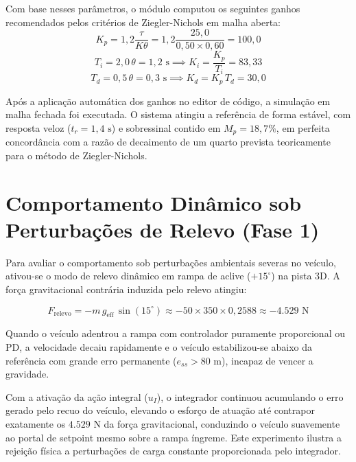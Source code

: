 Com base nesses parâmetros, o módulo computou os seguintes ganhos recomendados pelos critérios de Ziegler-Nichols em malha aberta:
\begin{equation}
    K_p = 1{,}2 \frac{\tau}{K \theta} = 1{,}2 \frac{25{,}0}{0{,}50 \times 0{,}60} = 100{,}0
\end{equation}
\begin{equation}
    T_i = 2{,}0 \, \theta = 1{,}2\text{ s} \implies K_i = \frac{K_p}{T_i} = 83{,}33
\end{equation}
\begin{equation}
    T_d = 0{,}5 \, \theta = 0{,}3\text{ s} \implies K_d = K_p \, T_d = 30{,}0
\end{equation}

Após a aplicação automática dos ganhos no editor de código, a simulação em malha fechada foi executada. O sistema atingiu a referência de forma estável, com resposta veloz ($t_r = 1{,}4\text{ s}$) e sobressinal contido em $M_p = 18{,}7\%$, em perfeita concordância com a razão de decaimento de um quarto prevista teoricamente para o método de Ziegler-Nichols.

\section{Comportamento Dinâmico sob Perturbações de Relevo (Fase 1)}
\label{sec:perturbacoes_relevo}

Para avaliar o comportamento sob perturbações ambientais severas no veículo, ativou-se o modo de relevo dinâmico em rampa de aclive ($+15^\circ$) na pista 3D. A força gravitacional contrária induzida pelo relevo atingiu:

\begin{equation}
    F_{\text{relevo}} = - m \, g_{\text{eff}} \, \sin(15^\circ) \approx -50 \times 350 \times 0{,}2588 \approx -4.529\text{ N}
\end{equation}

Quando o veículo adentrou a rampa com controlador puramente proporcional ou PD, a velocidade decaiu rapidamente e o veículo estabilizou-se abaixo da referência com grande erro permanente ($e_{ss} > 80\text{ m}$), incapaz de vencer a gravidade. 

Com a ativação da ação integral ($u_I$), o integrador continuou acumulando o erro gerado pelo recuo do veículo, elevando o esforço de atuação até contrapor exatamente os $4.529\text{ N}$ da força gravitacional, conduzindo o veículo suavemente ao portal de setpoint mesmo sobre a rampa íngreme. Este experimento ilustra a rejeição física a perturbações de carga constante proporcionada pelo integrador.

